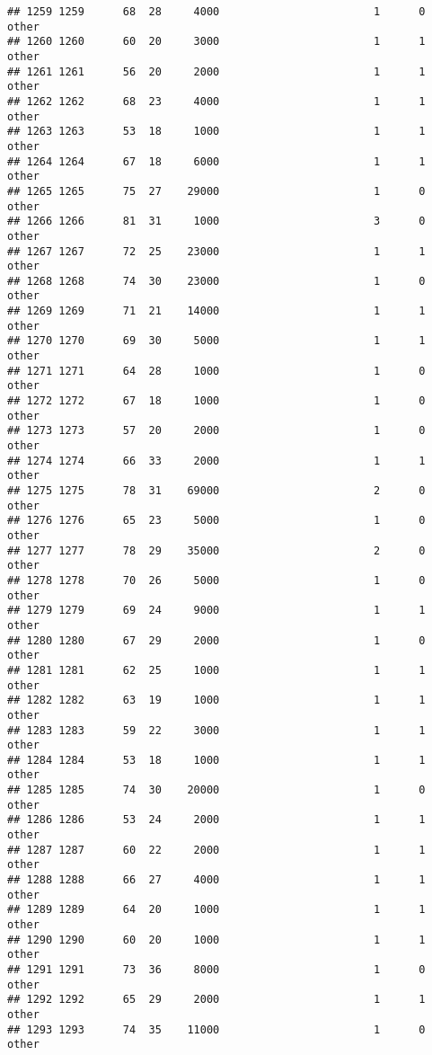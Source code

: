 \documentclass[
]{article}
\begin{document}
\begin{verbatim}
## 1259 1259      68  28     4000                        1      0    other
## 1260 1260      60  20     3000                        1      1    other
## 1261 1261      56  20     2000                        1      1    other
## 1262 1262      68  23     4000                        1      1    other
## 1263 1263      53  18     1000                        1      1    other
## 1264 1264      67  18     6000                        1      1    other
## 1265 1265      75  27    29000                        1      0    other
## 1266 1266      81  31     1000                        3      0    other
## 1267 1267      72  25    23000                        1      1    other
## 1268 1268      74  30    23000                        1      0    other
## 1269 1269      71  21    14000                        1      1    other
## 1270 1270      69  30     5000                        1      1    other
## 1271 1271      64  28     1000                        1      0    other
## 1272 1272      67  18     1000                        1      0    other
## 1273 1273      57  20     2000                        1      0    other
## 1274 1274      66  33     2000                        1      1    other
## 1275 1275      78  31    69000                        2      0    other
## 1276 1276      65  23     5000                        1      0    other
## 1277 1277      78  29    35000                        2      0    other
## 1278 1278      70  26     5000                        1      0    other
## 1279 1279      69  24     9000                        1      1    other
## 1280 1280      67  29     2000                        1      0    other
## 1281 1281      62  25     1000                        1      1    other
## 1282 1282      63  19     1000                        1      1    other
## 1283 1283      59  22     3000                        1      1    other
## 1284 1284      53  18     1000                        1      1    other
## 1285 1285      74  30    20000                        1      0    other
## 1286 1286      53  24     2000                        1      1    other
## 1287 1287      60  22     2000                        1      1    other
## 1288 1288      66  27     4000                        1      1    other
## 1289 1289      64  20     1000                        1      1    other
## 1290 1290      60  20     1000                        1      1    other
## 1291 1291      73  36     8000                        1      0    other
## 1292 1292      65  29     2000                        1      1    other
## 1293 1293      74  35    11000                        1      0    other

\end{verbatim}
\end{document}
